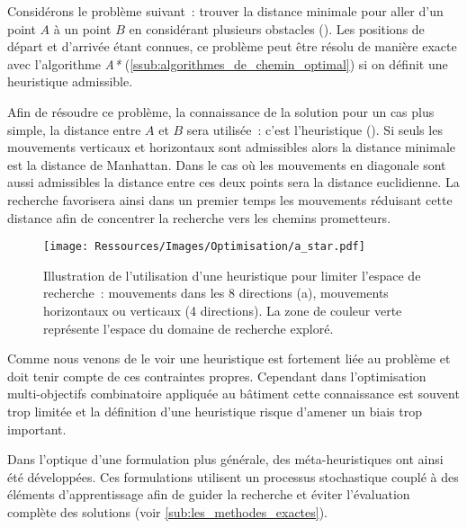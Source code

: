 Considérons le problème suivant~: trouver la distance minimale pour aller d’un point
$A$ à un point $B$ en considérant plusieurs obstacles ().
Les positions de départ et d’arrivée étant connues, ce problème peut être résolu
de manière exacte avec l’algorithme \textit{A*} (\ref{ssub:algorithmes_de_chemin_optimal})
si on définit une heuristique admissible.

Afin de résoudre ce problème, la connaissance de la solution pour un cas plus
simple, la distance entre $A$ et $B$ sera utilisée~: c’est l’heuristique
(). Si seuls les mouvements verticaux et horizontaux sont
admissibles alors la distance minimale est la distance de Manhattan. Dans le cas
où les mouvements en diagonale sont aussi admissibles la distance entre ces deux
points sera la distance euclidienne. La recherche favorisera ainsi dans un
premier temps les mouvements réduisant cette distance afin de concentrer la
recherche vers les chemins prometteurs.

\begin{figure}
    \centering
    \texttt{[image: Ressources/Images/Optimisation/a\_star.pdf]}
    \caption[Illustration de l’utilisation d’une heuristique]
            {Illustration de l’utilisation d’une heuristique pour limiter l’espace
             de recherche~: mouvements dans les 8 directions (a), mouvements
             horizontaux ou verticaux (4 directions). La zone de couleur verte
             représente l’espace du domaine de recherche exploré.}
    \label{fig:a_star}
\end{figure}

Comme nous venons de le voir une heuristique est fortement liée au problème et
doit tenir compte de ces contraintes propres. Cependant dans l’optimisation
multi-objectifs combinatoire appliquée au bâtiment cette connaissance est souvent
trop limitée et la définition d’une heuristique risque d’amener un biais trop
important.

Dans l’optique d’une formulation plus générale, des méta-heuristiques ont ainsi
été développées. Ces formulations utilisent un processus stochastique couplé à des
éléments d’apprentissage afin de guider la recherche et éviter l’évaluation
complète des solutions (voir \ref{sub:les_methodes_exactes}).



